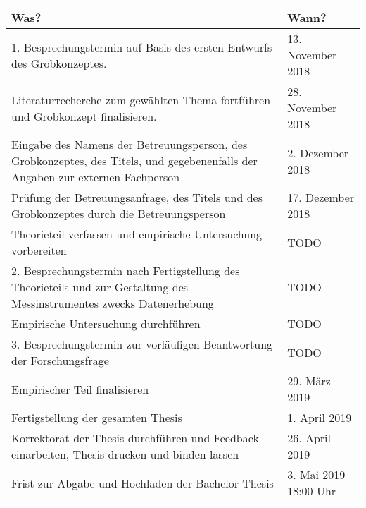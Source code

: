 \documentclass[12pt, twoside, table]{extarticle}
\begin{document}
\begin{center}
    \renewcommand{\arraystretch}{1.25}
    \setlength{\tabcolsep}{15pt}
    \begin{tabular}{ | p{8cm} | l |}
    \hline
    \rowcolor{ccc} Was? & Wann? \\ \hline
    1. Besprechungstermin auf Basis des ersten Entwurfs des Grobkonzeptes. & 13. November 2018 \\ \hline
    
    Literaturrecherche zum gewählten Thema fortführen und Grobkonzept finalisieren. & 28. November 2018 \\ \hline
    
    \rowcolor{orange} Eingabe des Namens der Betreuungsperson, des Grobkonzeptes, des Titels, und gegebenenfalls der Angaben zur externen Fachperson & 2. Dezember 2018 \\ \hline
    
    Prüfung der Betreuungsanfrage, des Titels und des Grobkonzeptes durch die Betreuungsperson & 17. Dezember 2018 \\ \hline
    
    Theorieteil verfassen und empirische Untersuchung vorbereiten & TODO \\ \hline
    
    2. Besprechungstermin nach Fertigstellung des Theorieteils und zur Gestaltung des Messinstrumentes zwecks Datenerhebung & TODO \\ \hline
    
    Empirische Untersuchung durchführen & TODO \\ \hline
    
    3. Besprechungstermin zur vorläufigen Beantwortung der Forschungsfrage & TODO \\ \hline
    
    Empirischer Teil finalisieren & 29. März 2019 \\ \hline
    
    Fertigstellung der gesamten Thesis & 1. April 2019 \\ \hline
    
    Korrektorat der Thesis durchführen und Feedback einarbeiten, Thesis drucken und binden lassen & 26. April 2019 \\ \hline
    
    \rowcolor{orange} Frist zur Abgabe und Hochladen der Bachelor Thesis & 3. Mai 2019 18:00 Uhr \\ \hline
    
    \end{tabular}
\end{center}
\end{document}
